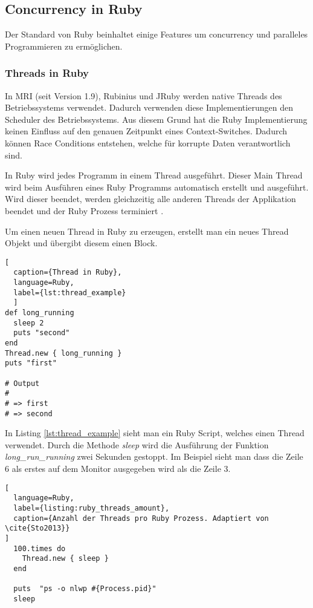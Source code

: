 \subsection{Concurrency in Ruby}
Der Standard von Ruby beinhaltet einige Features um concurrency und paralleles Programmieren zu ermöglichen.

\subsubsection{Threads in Ruby}
In MRI (seit Version 1.9), Rubinius und JRuby werden native Threads des Betriebssystems verwendet. Dadurch verwenden diese Implementierungen den Scheduler des Betriebssystems. Aus diesem Grund hat die Ruby Implementierung keinen Einfluss auf den genauen Zeitpunkt eines Context-Switches. Dadurch können Race Conditions entstehen, welche für korrupte Daten verantwortlich sind.

In Ruby wird jedes Programm in einem Thread ausgeführt. Dieser Main Thread wird beim Ausführen eines Ruby Programms automatisch erstellt und ausgeführt. Wird dieser beendet, werden gleichzeitig alle anderen Threads der Applikation beendet und der Ruby Prozess terminiert \cite[p. 15]{Sto2013}.

Um einen neuen Thread in Ruby zu erzeugen, erstellt man ein neues Thread Objekt und übergibt diesem einen Block. 

\begin{lstlisting}[
  caption={Thread in Ruby}, 
  language=Ruby,
  label={lst:thread_example}
  ]
def long_running
  sleep 2
  puts "second"
end
Thread.new { long_running }
puts "first"

# Output
#
# => first
# => second

\end{lstlisting}

In Listing \ref{lst:thread_example} sieht man ein Ruby Script, welches einen Thread verwendet. Durch die Methode \emph{sleep} wird die Ausführung der Funktion \textit{long\_run\_running} zwei Sekunden gestoppt. Im Beispiel sieht man dass die Zeile 6 als erstes auf dem Monitor ausgegeben wird als die Zeile 3. 

\begin{lstlisting}[
  language=Ruby,
  label={listing:ruby_threads_amount},
  caption={Anzahl der Threads pro Ruby Prozess. Adaptiert von \cite{Sto2013}}
]
  100.times do
    Thread.new { sleep }
  end
  
  puts  "ps -o nlwp #{Process.pid}"
  sleep
\end{lstlisting} 

